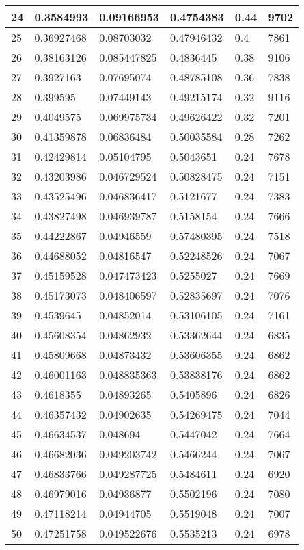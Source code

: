 \begin{longtable}{|l|l|l|l|l|l|}
24 & 0.3584993 & 0.09166953 & 0.4754383 & 0.44 & 9702 \\ \hline 
25 & 0.36927468 & 0.08703032 & 0.47946432 & 0.4 & 7861 \\ \hline 
26 & 0.38163126 & 0.085447825 & 0.4836445 & 0.38 & 9106 \\ \hline 
27 & 0.3927163 & 0.07695074 & 0.48785108 & 0.36 & 7838 \\ \hline 
28 & 0.399595 & 0.07449143 & 0.49215174 & 0.32 & 9116 \\ \hline 
29 & 0.4049575 & 0.069975734 & 0.49626422 & 0.32 & 7201 \\ \hline 
30 & 0.41359878 & 0.06836484 & 0.50035584 & 0.28 & 7262 \\ \hline 
31 & 0.42429814 & 0.05104795 & 0.5043651 & 0.24 & 7678 \\ \hline 
32 & 0.43203986 & 0.046729524 & 0.50828475 & 0.24 & 7151 \\ \hline 
33 & 0.43525496 & 0.046836417 & 0.5121677 & 0.24 & 7383 \\ \hline 
34 & 0.43827498 & 0.046939787 & 0.5158154 & 0.24 & 7666 \\ \hline 
35 & 0.44222867 & 0.04946559 & 0.57480395 & 0.24 & 7518 \\ \hline 
36 & 0.44688052 & 0.04816547 & 0.52248526 & 0.24 & 7067 \\ \hline 
37 & 0.45159528 & 0.047473423 & 0.5255027 & 0.24 & 7669 \\ \hline 
38 & 0.45173073 & 0.048406597 & 0.52835697 & 0.24 & 7076 \\ \hline 
39 & 0.4539645 & 0.04852014 & 0.53106105 & 0.24 & 7161 \\ \hline 
40 & 0.45608354 & 0.04862932 & 0.53362644 & 0.24 & 6835 \\ \hline 
41 & 0.45809668 & 0.04873432 & 0.53606355 & 0.24 & 6862 \\ \hline 
42 & 0.46001163 & 0.048835363 & 0.53838176 & 0.24 & 6862 \\ \hline 
43 & 0.4618355 & 0.04893265 & 0.5405896 & 0.24 & 6826 \\ \hline 
44 & 0.46357432 & 0.04902635 & 0.54269475 & 0.24 & 7044 \\ \hline 
45 & 0.46634537 & 0.048694 & 0.5447042 & 0.24 & 7664 \\ \hline 
46 & 0.46682036 & 0.049203742 & 0.5466244 & 0.24 & 7067 \\ \hline 
47 & 0.46833766 & 0.049287725 & 0.5484611 & 0.24 & 6920 \\ \hline 
48 & 0.46979016 & 0.04936877 & 0.5502196 & 0.24 & 7080 \\ \hline 
49 & 0.47118214 & 0.04944705 & 0.5519048 & 0.24 & 7007 \\ \hline 
50 & 0.47251758 & 0.049522676 & 0.5535213 & 0.24 & 6978 \\ \hline 
\end{longtable}